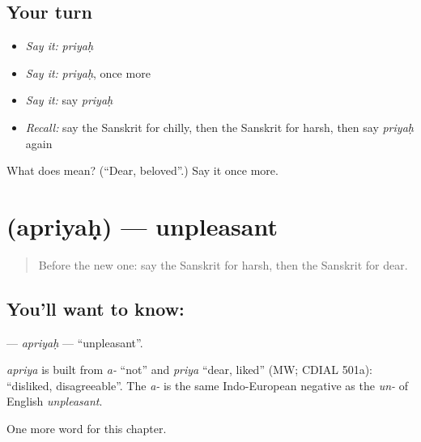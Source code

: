 \subsection*{Your turn}
\begin{itemize}
\raggedright
  \item \emph{Say it:} \emph{priyaḥ}
  \item \emph{Say it:} \emph{priyaḥ}, once more
  \item \emph{Say it:} say \emph{priyaḥ}
  \item \emph{Recall:} say the Sanskrit for chilly, then the Sanskrit for harsh, then say \emph{priyaḥ} again
\end{itemize}

\begin{tcolorbox}[breakable,colback=teal!4,colframe=teal!35!black,title={Before you move on}]
What does  mean? (\textquotedblleft{}Dear, beloved\textquotedblright{}.) Say it once more.
\end{tcolorbox}
\section[\texorpdfstring{\sk{अप्रियः} (apriyaḥ)}{अप्रियः (apriyaḥ)}]{ (apriyaḥ) — unpleasant}

\label{lesson:SA-C156-apriyah}



\begin{quote}
Before the new one: say the Sanskrit for harsh, then the Sanskrit for dear.
\end{quote}

\subsection*{You'll want to know: }
\textbf{} — \emph{apriyaḥ} — \textquotedblleft{}unpleasant\textquotedblright{}.

\begin{cousinweb}
\emph{apriya} is built from \emph{a-} \textquotedblleft{}not\textquotedblright{} and \emph{priya} \textquotedblleft{}dear, liked\textquotedblright{} (MW; CDIAL 501a): \textquotedblleft{}disliked, disagreeable\textquotedblright{}. The \emph{a-} is the same Indo-European negative as the \emph{un-} of English \emph{unpleasant}.
\end{cousinweb}

\begin{grammarlens}[title={What you've built}]
One more word for this chapter.
\end{grammarlens}

